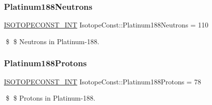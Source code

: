 \subsubsection{\texorpdfstring{Platinum188\+Neutrons}{Platinum188Neutrons}}
{\footnotesize\ttfamily \mbox{\hyperlink{group___isotope_const-_macros_ga5f18360b3e99483a35c32d789e62621c}{I\+S\+O\+T\+O\+P\+E\+C\+O\+N\+S\+T\+\_\+\+I\+NT}} Isotope\+Const\+::\+Platinum188\+Neutrons = 110}

\$ \$ Neutrons in Platinum-\/188. \mbox{\label{group___isotope_const-_platinum-_pt188_ga08547d11745d815ce0f23f1bd0cd51ac}} 
\subsubsection{\texorpdfstring{Platinum188\+Protons}{Platinum188Protons}}
{\footnotesize\ttfamily \mbox{\hyperlink{group___isotope_const-_macros_ga5f18360b3e99483a35c32d789e62621c}{I\+S\+O\+T\+O\+P\+E\+C\+O\+N\+S\+T\+\_\+\+I\+NT}} Isotope\+Const\+::\+Platinum188\+Protons = 78}

\$ \$ Protons in Platinum-\/188. 